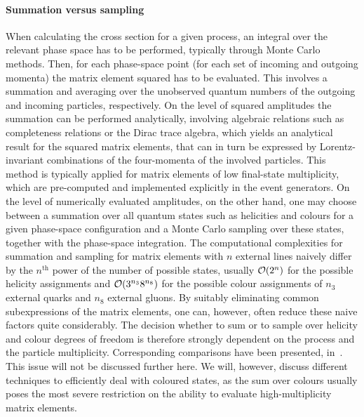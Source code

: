\paragraph{Summation versus sampling}

When calculating the cross section for a given process, an integral
over the relevant phase space has to be performed, typically through
Monte Carlo methods.  Then, for each phase-space point (\ie for each
set of incoming and outgoing momenta) the matrix element squared has
to be evaluated.  This involves a summation and averaging over the
unobserved quantum numbers of the outgoing and incoming particles,
respectively.  On the level of squared amplitudes the summation can be
performed analytically, involving algebraic relations such as
completeness relations or the Dirac trace algebra, which yields an
analytical result for the squared matrix elements, that can in turn be
expressed by Lorentz-invariant combinations of the four-momenta of the
involved particles.  This method is typically applied for matrix
elements of low final-state multiplicity, which are pre-computed and
implemented explicitly in the event generators.  On the level of
numerically evaluated amplitudes, on the other hand, one may choose
between a summation over all quantum states such as helicities and
colours for a given phase-space configuration and a Monte Carlo
sampling over these states, together with the phase-space integration.
The computational complexities for summation and sampling for matrix
elements with $n$ external lines naively differ by the
$n^{\mathrm{th}}$
power of the number of possible states, \ie usually ${\cal
  O}(2^n)$ for the possible helicity assignments and ${\cal
  O}(3^{n_3}8^{n_8})$ for the possible colour assignments of $n_3$
external quarks and $n_8$ external gluons.  By suitably eliminating
common subexpressions of the matrix elements, one can, however, often
reduce these naive factors quite considerably.  The decision whether
to sum or to sample over helicity and colour degrees of freedom is
therefore strongly dependent on the process and the particle
multiplicity.  Corresponding comparisons have been presented, \eg
in~\cite{Gleisberg:2008fv}. This issue will not be discussed further
here.  We will, however, discuss different techniques to efficiently
deal with coloured states, as the sum over colours usually poses the
most severe restriction on the ability to evaluate high-multiplicity
matrix elements.
 

